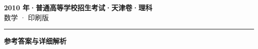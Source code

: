 \documentclass[zihao=5, a4paper]{ctexart}
\begin{document}
\begin{center}
  {\Large\bfseries 2010 年·普通高等学校招生考试·天津卷·理科}\\[4pt]
  {\large 数学 · 印刷版}
\end{center}
\medskip
{}

\par\bigskip\hrule\bigskip
{}
\begin{center}{\large\bfseries 参考答案与详细解析}\end{center}
\smallskip

\end{document}
